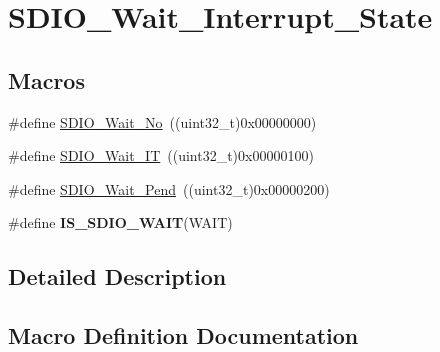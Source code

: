 \hypertarget{group___s_d_i_o___wait___interrupt___state}{}\section{S\+D\+I\+O\+\_\+\+Wait\+\_\+\+Interrupt\+\_\+\+State}
\label{group___s_d_i_o___wait___interrupt___state}
\subsection*{Macros}
\begin{DoxyCompactItemize}
\item 
\#define \hyperlink{group___s_d_i_o___wait___interrupt___state_ga266294e1ffd7a4b45e62bff753ca44b2}{S\+D\+I\+O\+\_\+\+Wait\+\_\+\+No}~((uint32\+\_\+t)0x00000000)
\item 
\#define \hyperlink{group___s_d_i_o___wait___interrupt___state_ga3914bbe26a656c8e151272ccdc12c71c}{S\+D\+I\+O\+\_\+\+Wait\+\_\+\+I\+T}~((uint32\+\_\+t)0x00000100)
\item 
\#define \hyperlink{group___s_d_i_o___wait___interrupt___state_ga2a4104023a7f8403ddd159ec3bbb8592}{S\+D\+I\+O\+\_\+\+Wait\+\_\+\+Pend}~((uint32\+\_\+t)0x00000200)
\item 
\#define {\bfseries I\+S\+\_\+\+S\+D\+I\+O\+\_\+\+W\+A\+I\+T}(W\+A\+I\+T)
\end{DoxyCompactItemize}


\subsection{Detailed Description}


\subsection{Macro Definition Documentation}
\hypertarget{group___s_d_i_o___wait___interrupt___state_ga7ee5c289c8e06a76b849808d15b03810}{}
